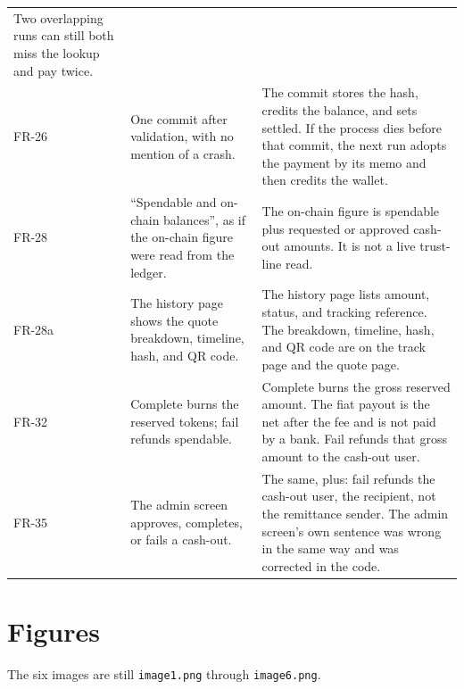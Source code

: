 \documentclass[11pt,a4paper]{article}
\begin{document}
{\begin{longtable}{@{}>{\raggedright\arraybackslash}p{1.35cm}>{\raggedright\arraybackslash}p{6.3cm}>{\raggedright\arraybackslash}p{7.1cm}@{}}
Two overlapping runs can still both miss the lookup and pay twice. \\
FR-26 &
One commit after validation, with no mention of a crash. &
The commit stores the hash, credits the balance, and sets settled.
If the process dies before that commit, the next run adopts the payment by its memo and then credits the wallet. \\
FR-28 &
``Spendable and on-chain balances'', as if the on-chain figure were read from the ledger. &
The on-chain figure is spendable plus requested or approved cash-out amounts.
It is not a live trust-line read. \\
FR-28a &
The history page shows the quote breakdown, timeline, hash, and QR code. &
The history page lists amount, status, and tracking reference.
The breakdown, timeline, hash, and QR code are on the track page and the quote page. \\
FR-32 &
Complete burns the reserved tokens; fail refunds spendable. &
Complete burns the gross reserved amount.
The fiat payout is the net after the fee and is not paid by a bank.
Fail refunds that gross amount to the cash-out user. \\
FR-35 &
The admin screen approves, completes, or fails a cash-out. &
The same, plus: fail refunds the cash-out user, the recipient, not the remittance sender.
The admin screen's own sentence was wrong in the same way and was corrected in the code. \\
\bottomrule
\end{longtable}
}

\section{Figures}

The six images are still \texttt{image1.png} through \texttt{image6.png}.
\end{document}
